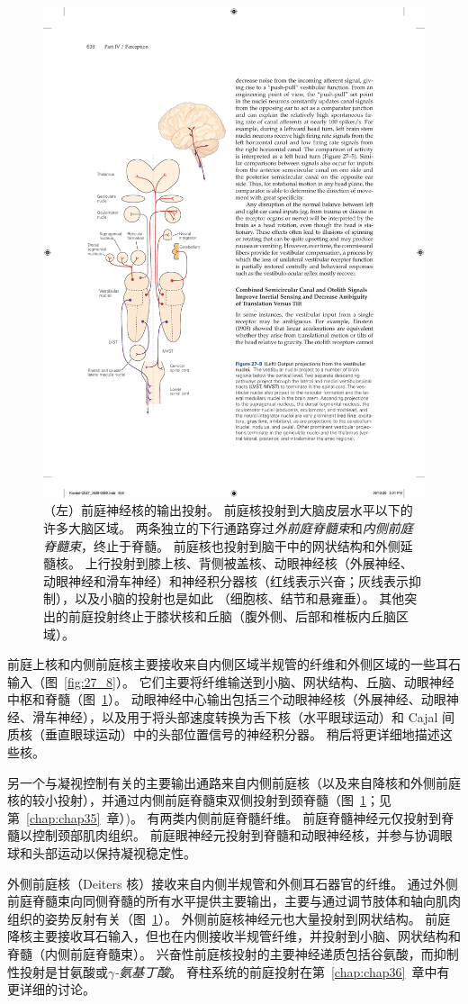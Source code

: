 \begin{figure}[htbp]
	\centering
	\includegraphics[width=0.4\linewidth]{chap27/fig_27_9}
	\caption{（左）前庭神经核的输出投射。
		前庭核投射到大脑皮层水平以下的许多大脑区域。
		两条独立的下行通路穿过\textit{外前庭脊髓束}和\textit{内侧前庭脊髓束}，终止于脊髓。
		前庭核也投射到脑干中的网状结构和外侧延髓核。
		上行投射到膝上核、背侧被盖核、动眼神经核（外展神经、动眼神经和滑车神经）和神经积分器核（红线表示兴奋；灰线表示抑制），以及小脑的投射也是如此 （细胞核、结节和悬雍垂）。
		其他突出的前庭投射终止于膝状核和丘脑（腹外侧、后部和椎板内丘脑区域）。}
	\label{fig:27_9}
\end{figure}


前庭上核和内侧前庭核主要接收来自内侧区域半规管的纤维和外侧区域的一些耳石输入（图~\ref{fig:27_8}）。
它们主要将纤维输送到小脑、网状结构、丘脑、动眼神经中枢和脊髓（图~\ref{fig:27_9}）。
动眼神经中心输出包括三个动眼神经核（外展神经、动眼神经、滑车神经），以及用于将头部速度转换为舌下核（水平眼球运动）和 Cajal 间质核（垂直眼球运动）中的头部位置信号的神经积分器。
稍后将更详细地描述这些核。


另一个与凝视控制有关的主要输出通路来自内侧前庭核（以及来自降核和外侧前庭核的较小投射），并通过内侧前庭脊髓束双侧投射到颈脊髓（图~\ref{fig:27_9}；见第~\ref{chap:chap35}~章）)。
有两类内侧前庭脊髓纤维。
前庭脊髓神经元仅投射到脊髓以控制颈部肌肉组织。
前庭眼神经元投射到脊髓和动眼神经核，并参与协调眼球和头部运动以保持凝视稳定性。


外侧前庭核（Deiters 核）接收来自内侧半规管和外侧耳石器官的纤维。
通过外侧前庭脊髓束向同侧脊髓的所有水平提供主要输出，主要与通过调节肢体和轴向肌肉组织的姿势反射有关（图~\ref{fig:27_9}）。
外侧前庭核神经元也大量投射到网状结构。
前庭降核主要接收耳石输入，但也在内侧接收半规管纤维，并投射到小脑、网状结构和脊髓（内侧前庭脊髓束）。
兴奋性前庭核投射的主要神经递质包括谷氨酸，而抑制性投射是甘氨酸或\textit{$\gamma$-氨基丁酸}。
脊柱系统的前庭投射在第~\ref{chap:chap36}~章中有更详细的讨论。



